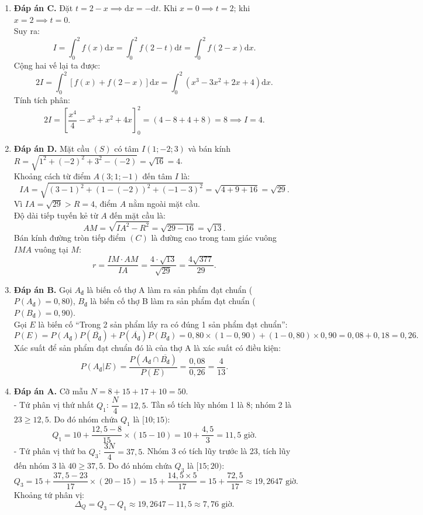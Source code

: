 \documentclass[12pt,a4paper]{article}
\begin{document}
\begin{enumerate}[label=\textbf{Câu \arabic*:}, leftmargin=*]
\item \textbf{Đáp án C.}
Đặt $t = 2 - x \implies \mathrm{d}x = -\mathrm{d}t$. Khi $x = 0 \implies t = 2$; khi $x = 2 \implies t = 0$.\\
Suy ra:
$$I = \int_0^2 f(x) \mathrm{d}x = \int_0^2 f(2 - t) \mathrm{d}t = \int_0^2 f(2 - x) \mathrm{d}x.$$
Cộng hai vế lại ta được:
$$2I = \int_0^2 \left[ f(x) + f(2 - x) \right] \mathrm{d}x = \int_0^2 (x^3 - 3x^2 + 2x + 4) \mathrm{d}x.$$
Tính tích phân:
$$2I = \left[ \dfrac{x^4}{4} - x^3 + x^2 + 4x \right]_0^2 = \left( 4 - 8 + 4 + 8 \right) = 8 \implies I = 4.$$

\item \textbf{Đáp án D.}
Mặt cầu $(S)$ có tâm $I(1; -2; 3)$ và bán kính $R = \sqrt{1^2 + (-2)^2 + 3^2 - (-2)} = \sqrt{16} = 4$.\\
Khoảng cách từ điểm $A(3; 1; -1)$ đến tâm $I$ là:
$$IA = \sqrt{(3 - 1)^2 + (1 - (-2))^2 + (-1 - 3)^2} = \sqrt{4 + 9 + 16} = \sqrt{29}.$$
Vì $IA = \sqrt{29} > R = 4$, điểm $A$ nằm ngoài mặt cầu.\\
Độ dài tiếp tuyến kẻ từ $A$ đến mặt cầu là:
$$AM = \sqrt{IA^2 - R^2} = \sqrt{29 - 16} = \sqrt{13}.$$
Bán kính đường tròn tiếp điểm $(C)$ là đường cao trong tam giác vuông $IMA$ vuông tại $M$:
$$r = \dfrac{IM \cdot AM}{IA} = \dfrac{4 \cdot \sqrt{13}}{\sqrt{29}} = \dfrac{4\sqrt{377}}{29}.$$

\item \textbf{Đáp án B.}
Gọi $A_{\text{đ}}$ là biến cố thợ A làm ra sản phẩm đạt chuẩn ($P(A_{\text{đ}}) = 0{,}80$), $B_{\text{đ}}$ là biến cố thợ B làm ra sản phẩm đạt chuẩn ($P(B_{\text{đ}}) = 0{,}90$).\\
Gọi $E$ là biến cố ``Trong 2 sản phẩm lấy ra có đúng 1 sản phẩm đạt chuẩn'':
$$P(E) = P(A_{\text{đ}})P(\overline{B_{\text{đ}}}) + P(\overline{A_{\text{đ}}})P(B_{\text{đ}}) = 0{,}80 \times (1 - 0{,}90) + (1 - 0{,}80) \times 0{,}90 = 0{,}08 + 0{,}18 = 0{,}26.$$
Xác suất để sản phẩm đạt chuẩn đó là của thợ A là xác suất có điều kiện:
$$P(A_{\text{đ}} | E) = \dfrac{P(A_{\text{đ}} \cap \overline{B_{\text{đ}}})}{P(E)} = \dfrac{0{,}08}{0{,}26} = \dfrac{4}{13}.$$

\item \textbf{Đáp án A.}
Cỡ mẫu $N = 8 + 15 + 17 + 10 = 50$.\\
- Tứ phân vị thứ nhất $Q_1$: $\dfrac{N}{4} = 12{,}5$. Tần số tích lũy nhóm 1 là 8; nhóm 2 là $23 \ge 12{,}5$. Do đó nhóm chứa $Q_1$ là $[10; 15)$:
$$Q_1 = 10 + \dfrac{12{,}5 - 8}{15} \times (15 - 10) = 10 + \dfrac{4{,}5}{3} = 11{,}5\text{ giờ}.$$
- Tứ phân vị thứ ba $Q_3$: $\dfrac{3N}{4} = 37{,}5$. Nhóm 3 có tích lũy trước là 23, tích lũy đến nhóm 3 là $40 \ge 37{,}5$. Do đó nhóm chứa $Q_3$ là $[15; 20)$:
$$Q_3 = 15 + \dfrac{37{,}5 - 23}{17} \times (20 - 15) = 15 + \dfrac{14{,}5 \times 5}{17} = 15 + \dfrac{72{,}5}{17} \approx 19{,}2647\text{ giờ}.$$
Khoảng tứ phân vị:
$$\Delta_Q = Q_3 - Q_1 \approx 19{,}2647 - 11{,}5 \approx 7{,}76\text{ giờ}.$$


\end{enumerate}
\end{document}
